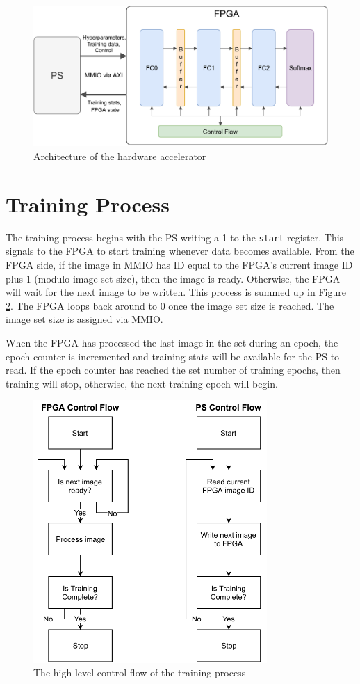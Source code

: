 \begin{figure}
	\centering 
	\includegraphics[width=\textwidth]{figures/overall_arch}
	\caption{Architecture of the hardware accelerator}\label{overall-arch}
\end{figure}


\section{Training Process}
The training process begins with the PS writing a 1 to the \texttt{start} register. This signals to the FPGA to start training whenever data becomes available. From the FPGA side, if the image in MMIO has ID equal to the FPGA's current image ID plus 1 (modulo image set size), then the image is ready.  Otherwise, the FPGA will wait for the next image to be written. This process is summed up in Figure \ref{ps-pl-training-process}. The FPGA loops back around to 0 once the image set size is reached. The image set size is assigned via MMIO. 

When the FPGA has processed the last image in the set during an epoch, the epoch counter is incremented and training stats will be available for the PS to read. If the epoch counter has reached the set number of training epochs, then training will stop, otherwise, the next training epoch will begin. 

\begin{figure}
	\centering 
	\includegraphics[width=3.5in]{figures/training_process_ps_pl}
	\caption{The high-level control flow of the training process}
	\label{ps-pl-training-process}
\end{figure}

